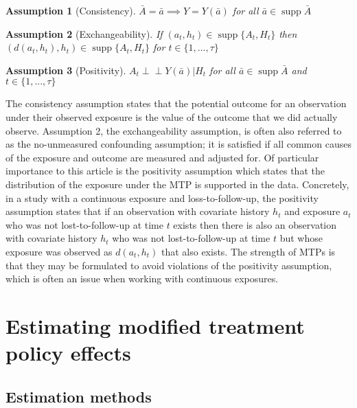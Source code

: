 \documentclass[]{jss}
\begin{document}
\newtheorem{assumption}{Assumption}

\begin{assumption}[Consistency]
\(\bar{A} = \bar{a} \implies Y = Y(\bar{a})\) for all $\bar{a} \in \mathop{\mathrm{supp}}\bar{A}$ 
\end{assumption}
\begin{assumption}[Exchangeability]
If $(a_t, h_t) \in \mathop{\mathrm{supp}}\{A_t, H_t\}$ then $(d(a_t, h_t), h_t) \in \mathop{\mathrm{supp}}\{A_t, H_t\}$ for $t \in \{1, ..., \tau \}$
\end{assumption}
\begin{assumption}[Positivity]
$A_t \perp \!\!\! \perp Y(\bar{a}) | H_t$ for all $\bar{a} \in \mathop{\mathrm{supp}}\bar{A}$ and $t \in \{1, ..., \tau\}$
\end{assumption}

The consistency assumption states that the potential outcome for an
observation under their observed exposure is the value of the
outcome that we did actually observe. Assumption 2, the exchangeability
assumption, is often also referred to as the no-unmeasured confounding
assumption; it is satisfied if all common causes of the exposure and
outcome are measured and adjusted for. Of particular importance to this
article is the positivity assumption which states that the distribution of
the exposure under the MTP is supported in the data. Concretely, in a study with a
continuous exposure and loss-to-follow-up, the positivity assumption
states that if an observation with covariate history \(h_t\) and
exposure \(a_t\) who was not lost-to-follow-up at time \(t\) exists then
there is also an observation with covariate history \(h_t\) who was not
lost-to-follow-up at time \(t\) but whose exposure was observed as
\(d(a_t, h_t)\) that also exists. The strength of MTPs is that they may
be formulated to avoid violations of the positivity assumption,
which is often an issue when working with continuous exposures.

\hypertarget{estimating-modified-treatment-policy-effects}{%
\section{Estimating modified treatment policy
effects}\label{estimating-modified-treatment-policy-effects}}

\hypertarget{estimation-methods}{%
\subsection{Estimation methods}\label{estimation-methods}}
\end{document}
